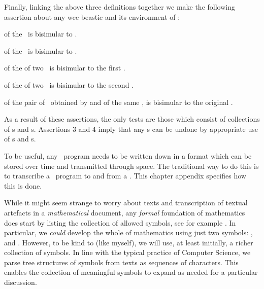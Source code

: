 Finally, linking the above three definitions together we make the 
following assertion about any wee beastie and its environment of \lols: 

\begingroup\startAssertion

\startitemize[n]

\item {} of the  \lol\ is bisimular to 
. 

\item {} of the  \lol\ is bisimular to 
. 

\item {} of the  of two \lols\ is 
bisimular to the first \lol. 

\item {} of the  of two \lols\ is 
bisimular to the second \lol. 

\item {} of the pair of \lols\ obtained by 
 and  of the same \lol, is bisimular 
to the original \lol. 

\stopAssertion\endgroup

As a result of these assertions, the only  tests are 
those which consist of collections of s and 
s. Assertions 3 and 4 imply that any 
s can be undone by appropriate use of 
s and s.  

\startChapterAppendices

\chapterAppendix[title={Texts: transcribing Lists of Lists}]

To be useful, any \joylol\ program needs to be written down in a format 
which can be stored over time and transmitted through space. The 
traditional way to do this is to transcribe a \joylol\ program to and from 
a . This chapter appendix specifies how this 
is done. 

While it might seem strange to worry about texts and transcription of 
textual artefacts in a \emph{mathematical} document, any \emph{formal} 
foundation of mathematics does start by listing the collection of allowed 
symbols, see for example \cite{kleene2009introMetaMathematics}. In 
particular, we \emph{could} develop the whole of mathematics using just 
two symbols: \quote{(}, and \quote{)}. However, to be kind to  (like myself), we will use, at least initially, a 
richer collection of symbols. In line with the typical practice of 
Computer Science, we parse tree structures of symbols from texts as 
sequences of characters. This enables the collection of meaningful symbols 
to expand as needed for a particular discussion. 

